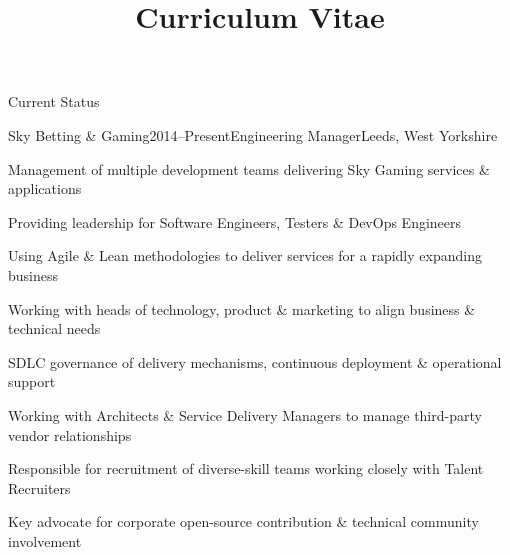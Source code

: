 \documentclass{cv}
\title{Curriculum Vitae}
\begin{document}

\begin{rSection}{Current Status}

\begin{rSubsection}{Sky Betting \& Gaming}{2014--Present}{Engineering Manager}{Leeds, West Yorkshire}
\item Management of multiple development teams delivering Sky Gaming services \& applications
\item Providing leadership for Software Engineers, Testers \& DevOps Engineers
\item Using Agile \& Lean methodologies to deliver services for a rapidly expanding business
\item Working with heads of technology, product \& marketing to align business \& technical needs
\item SDLC governance of delivery mechanisms, continuous deployment \& operational support
\item Working with Architects \& Service Delivery Managers to manage third-party vendor relationships
\item Responsible for recruitment of diverse-skill teams working closely with Talent Recruiters
\item Key advocate for corporate open-source contribution \& technical community involvement
\end{rSubsection}

\end{rSection}

\end{document}
